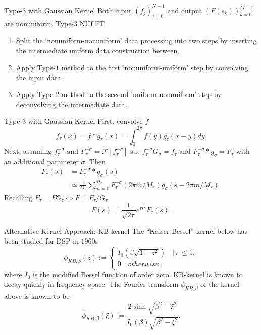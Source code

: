 \documentclass{beamer}
\begin{document}
\begin{frame}{Type-$3$ with Gaussian Kernel}
  Both input $(f_{j})_{j=0}^{N-1}$ and output $(F(s_{k}))_{k=0}^{M-1}$ are nonuniform.
  Type-$3$ NUFFT
  \begin{enumerate}
    \item Split the `nonuniform-nonuniform' data processing into two steps
    by inserting the intermediate uniform data construction between.
    \item Apply Type-$1$ method to the first `nonuniform-uniform' step by convolving the input data.
    \item Apply Type-$2$ method to the second 'uniform-nonuniform' step by deconvolving the intermediate data.
  \end{enumerate}
\end{frame}

\begin{frame}{Type-$3$ with Gaussian Kernel}
  First, convolve $f$
  \begin{equation}
      f_{\tau}(x) = f\ast g_{\tau} (x) = \int_{0}^{2\pi} f(y)g_{\tau}(x-y) dy.
  \end{equation}
  Next, assuming $f_{\tau}^{-\sigma}$ and $F_{\tau}^{-\sigma} = \mathcal{F}[f_{\tau}^{-\sigma}]$
  s.t.
  $f_{\tau}^{-\sigma}G_{\sigma} = f_{\tau}$ and $F_{\tau}^{-\sigma}\ast g_{\sigma} = F_{\tau}$
  with an additional parameter $\sigma$. Then
  \begin{align}
    F_{\tau}(s) &= F_{\tau}^{-\sigma}\ast g_{\sigma} (s) \\
    &\simeq \frac{1}{M_{r}}\sum_{m=0}^{M_{r}}
            F_{\tau}^{-\sigma}(2\pi m/M_{r})g_{\sigma}(s - 2\pi m/M_{r}).
  \end{align}
  Recalling $F_{\tau} = FG_{\tau} \Leftrightarrow F = F_{\tau}/G_{\tau}$,
  \begin{equation}
    F(s) = \frac{1}{\sqrt{2\tau}}e^{\tau s^2}F_{\tau}(s).
  \end{equation}
\end{frame}

\begin{frame}{Alternative Kernel Approach: KB-kernel}
  The ``Kaiser-Bessel'' kernel below \cite{Book-Kaiser} has been studied for DSP in $1960$s
  \begin{equation}
    \phi_{KB,\beta}(z) :=
    \begin{cases}
      I_{0}\left(\beta\sqrt{1-z^2}\right) \quad |z| \le 1,\\
      0 \quad otherwise,
    \end{cases}
    \label{eq:KB-kernel}
  \end{equation}
  where $I_{0}$ is the modified Bessel function of order zero.
  KB-kernel is known to decay quickly in frequency space.
  The Fourier transform $\phi_{KB,\beta}$ of the kernel above is known to be
  \begin{equation}
    \hat{\phi}_{KB,\beta}(\xi) :=
    \frac{2\sinh\sqrt{\beta^2-\xi^2}}{I_{0}(\beta)\sqrt{\beta^2-\xi^2}}.
    \label{eq:FT-KB-kernel}
  \end{equation}
\end{frame}
\end{document}
